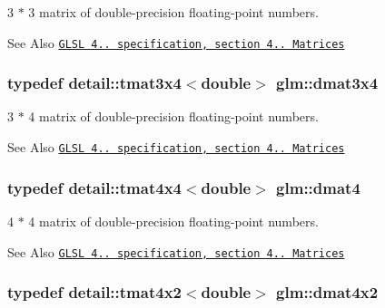 3 $\ast$ 3 matrix of double-\/precision floating-\/point numbers. 

\begin{DoxySeeAlso}{See Also}
\href{http://www.opengl.org/registry/doc/GLSLangSpec.4.20.8.pdf}{\tt G\-L\-S\-L 4.. specification, section 4.. Matrices} 
\end{DoxySeeAlso}
\hypertarget{group__core__types_ga9ec18b898499ad524dc93f2d4d78b877}{
\subsubsection[{dmat3x4}]{\setlength{\rightskip}{0pt plus 5cm}typedef detail\-::tmat3x4$<$double$>$ {\bf glm\-::dmat3x4}}}\label{group__core__types_ga9ec18b898499ad524dc93f2d4d78b877}


3 $\ast$ 4 matrix of double-\/precision floating-\/point numbers. 

\begin{DoxySeeAlso}{See Also}
\href{http://www.opengl.org/registry/doc/GLSLangSpec.4.20.8.pdf}{\tt G\-L\-S\-L 4.. specification, section 4.. Matrices} 
\end{DoxySeeAlso}
\hypertarget{group__core__types_ga68b5efb5d529f9031481ef36f9babd96}{
\subsubsection[{dmat4}]{\setlength{\rightskip}{0pt plus 5cm}typedef detail\-::tmat4x4$<$double$>$ {\bf glm\-::dmat4}}}\label{group__core__types_ga68b5efb5d529f9031481ef36f9babd96}


4 $\ast$ 4 matrix of double-\/precision floating-\/point numbers. 

\begin{DoxySeeAlso}{See Also}
\href{http://www.opengl.org/registry/doc/GLSLangSpec.4.20.8.pdf}{\tt G\-L\-S\-L 4.. specification, section 4.. Matrices} 
\end{DoxySeeAlso}
\hypertarget{group__core__types_gaec598e6dda8b2119877d992f5e0c1bae}{
\subsubsection[{dmat4x2}]{\setlength{\rightskip}{0pt plus 5cm}typedef detail\-::tmat4x2$<$double$>$ {\bf glm\-::dmat4x2}}}\label{group__core__types_gaec598e6dda8b2119877d992f5e0c1bae}


